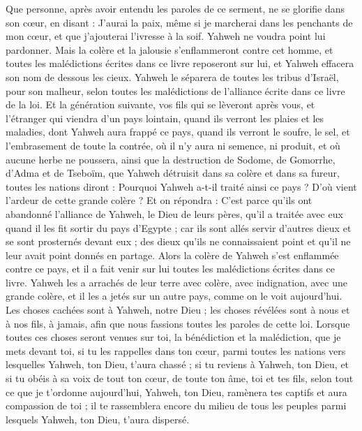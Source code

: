 \begin{multicols}{2}
Que personne, après avoir entendu les paroles de ce serment, ne se glorifie dans son cœur, en disant : J'aurai la paix, même si je marcherai dans les penchants de mon cœur, et que j’ajouterai l’ivresse à la soif.
Yahweh ne voudra point lui pardonner. Mais la colère et la jalousie s'enflammeront contre cet homme, et toutes les malédictions écrites dans ce livre reposeront sur lui, et Yahweh effacera son nom de dessous les cieux.
Yahweh le séparera de toutes les tribus d'Israël, pour son malheur, selon toutes les malédictions de l'alliance écrite dans ce livre de la loi.
Et la génération suivante, vos fils qui se lèveront après vous, et l’étranger qui viendra d'un pays lointain, quand ils verront les plaies et les maladies, dont Yahweh aura frappé ce pays,
quand ils verront le soufre, le sel, et l’embrasement de toute la contrée, où il n’y aura ni semence, ni produit, et où aucune herbe ne poussera, ainsi que la destruction de Sodome, de Gomorrhe, d'Adma et de Tseboïm, que Yahweh détruisit dans sa colère et dans sa fureur,
toutes les nations diront : Pourquoi Yahweh a-t-il traité ainsi ce pays ? D’où vient l’ardeur de cette grande colère ?
Et on répondra : C'est parce qu'ils ont abandonné l'alliance de Yahweh, le Dieu de leurs pères, qu’il a traitée avec eux quand il les fit sortir du pays d'Egypte ;
car ils sont allés servir d'autres dieux et se sont prosternés devant eux ; des dieux qu'ils ne connaissaient point et qu’il ne leur avait point donnés en partage.
Alors la colère de Yahweh s'est enflammée contre ce pays, et il a fait venir sur lui toutes les malédictions écrites dans ce livre.
Yahweh les a arrachés de leur terre avec colère, avec indignation, avec une grande colère, et il les a jetés sur un autre pays, comme on le voit aujourd'hui.
Les choses cachées sont à Yahweh, notre Dieu ; les choses révélées sont à nous et à nos fils, à jamais, afin que nous fassions toutes les paroles de cette loi.
\VerseOne{}Lorsque toutes ces choses seront venues sur toi, la bénédiction et la malédiction, que je mets devant toi, si tu les rappelles dans ton cœur, parmi toutes les nations vers lesquelles Yahweh, ton Dieu, t'aura chassé ;
si tu reviens à Yahweh, ton Dieu, et si tu obéis à sa voix de tout ton cœur, de toute ton âme, toi et tes fils, selon tout ce que je t’ordonne aujourd’hui,
Yahweh, ton Dieu, ramènera tes captifs et aura compassion de toi ; il te rassemblera encore du milieu de tous les peuples parmi lesquels Yahweh, ton Dieu, t'aura dispersé.

\end{multicols}

